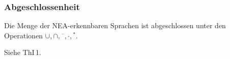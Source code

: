     \begin{frame}
      \frametitle{Abgeschlossenheit}
      
      \begin{Satz}
        Die Menge der NEA-erkennbaren Sprachen ist abgeschlossen unter den Operationen
        $\cup,\cap,\overline{\phantom{o}},\cdot,{}^\ast$.
        \label{thm:abgeschlossenheit}
      \end{Satz}

      \par\medskip
      Siehe ThI\,1.%

    \end{frame}

